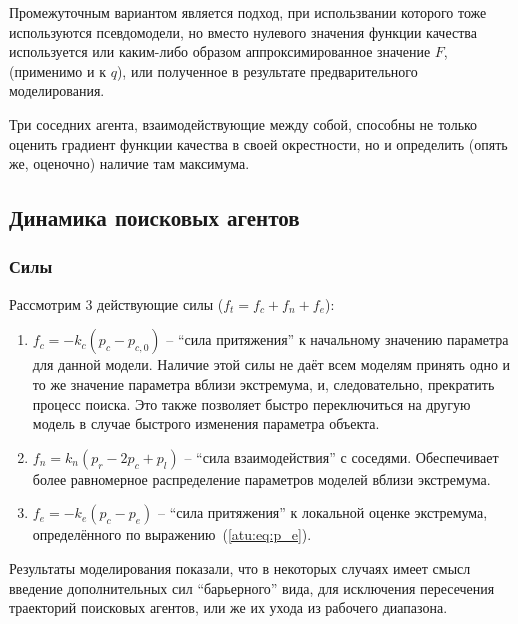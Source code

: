 Промежуточным вариантом является подход,
при использвании которого тоже используются
псевдомодели, но вместо нулевого значения
функции качества используется или каким-либо образом аппроксимированное
значение $F$, (применимо и к $q$), или полученное в результате
предварительного моделирования.




Три соседних агента, взаимодействующие между собой,
способны не только оценить градиент функции качества в своей окрестности,
но и определить (опять же, оценочно) наличие там максимума.



\subsection{Динамика поисковых агентов}  %


\subsubsection{Силы}  %

Рассмотрим 3 действующие силы
($ f_t = f_c + f_n + f_e $):

\begin{enumerate}
  \item
    $f_c = -k_c (p_c - p_{c,0}) $ -- ``сила притяжения'' к начальному значению
    параметра
    для данной модели. Наличие этой силы не даёт всем моделям принять одно
    и то же значение параметра вблизи экстремума, и, следовательно,
    прекратить процесс поиска. Это также позволяет быстро переключиться
    на другую модель в случае быстрого изменения параметра объекта.

  \item
    $f_n = k_n ( p_r - 2 p_c + p_l ) $ -- ``сила взаимодействия''
    с соседями. Обеспечивает более равномерное распределение
    параметров моделей вблизи экстремума.

  \item
    $f_e = - k_e ( p_c - p_e ) $ -- ``сила притяжения'' к локальной
    оценке экстремума, определённого по выражению~(\ref{atu:eq:p_e}).

\end{enumerate}

Результаты моделирования показали, что в некоторых случаях
имеет смысл введение дополнительных сил ``барьерного'' вида,
для исключения пересечения траекторий поисковых агентов, или же их ухода из рабочего диапазона.

